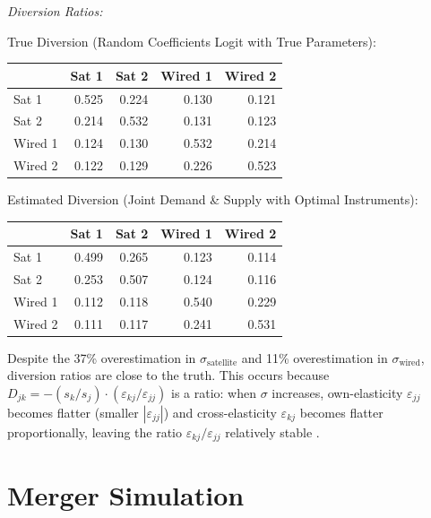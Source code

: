 \documentclass[english,11pt]{article}
\begin{document}
\begin{enumerate}
\textit{Diversion Ratios:}

True Diversion (Random Coefficients Logit with True Parameters):
\begin{center}
\begin{tabular}{lrrrr}
\hline
 & Sat 1 & Sat 2 & Wired 1 & Wired 2 \\
\hline
Sat 1 & 0.525 & 0.224 & 0.130 & 0.121 \\
Sat 2 & 0.214 & 0.532 & 0.131 & 0.123 \\
Wired 1 & 0.124 & 0.130 & 0.532 & 0.214 \\
Wired 2 & 0.122 & 0.129 & 0.226 & 0.523 \\
\hline
\end{tabular}
\end{center}

Estimated Diversion (Joint Demand \& Supply with Optimal Instruments):
\begin{center}
\begin{tabular}{lrrrr}
\hline
 & Sat 1 & Sat 2 & Wired 1 & Wired 2 \\
\hline
Sat 1 & 0.499 & 0.265 & 0.123 & 0.114 \\
Sat 2 & 0.253 & 0.507 & 0.124 & 0.116 \\
Wired 1 & 0.112 & 0.118 & 0.540 & 0.229 \\
Wired 2 & 0.111 & 0.117 & 0.241 & 0.531 \\
\hline
\end{tabular}
\end{center}

Despite the 37\% overestimation in $\sigma_{\text{satellite}}$ and 11\% overestimation in $\sigma_{\text{wired}}$, diversion ratios are close to the truth. This occurs because $D_{jk} = -(s_k/s_j) \cdot (\varepsilon_{kj}/\varepsilon_{jj})$ is a ratio: when $\sigma$ increases, own-elasticity $\varepsilon_{jj}$ becomes flatter (smaller $|\varepsilon_{jj}|$) and cross-elasticity $\varepsilon_{kj}$ becomes flatter proportionally, leaving the ratio $\varepsilon_{kj}/\varepsilon_{jj}$ relatively stable \citep{conlon2021diversion}.


\end{enumerate}


\section{Merger Simulation}
\end{document}
